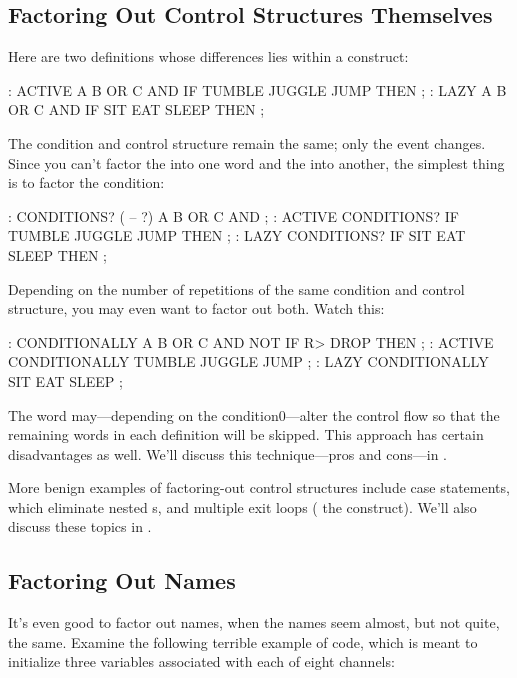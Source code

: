 \subsection{Factoring Out Control Structures Themselves}

Here are two definitions whose differences lies within a  construct:

\begin{Code}
: ACTIVE    A B OR  C AND  IF  TUMBLE JUGGLE JUMP THEN ;
: LAZY      A B OR  C AND  IF   SIT  EAT  SLEEP   THEN ;
\end{Code}
The condition and control structure remain the same; only the event
changes. Since you can't factor the  into one word and the
 into another, the simplest thing is to factor the
condition:

\begin{Code}
: CONDITIONS? ( -- ?) A B OR C AND ;
: ACTIVE    CONDITIONS? IF TUMBLE JUGGLE JUMP THEN ;
: LAZY      CONDITIONS? IF    SIT  EAT  SLEEP THEN ;
\end{Code}

\noindent 
Depending on the number of repetitions of the same condition and
control structure, you may even want to factor out both. Watch this:

\begin{Code}
: CONDITIONALLY   A B OR  C AND NOT IF  R> DROP   THEN ;
: ACTIVE   CONDITIONALLY   TUMBLE JUGGLE JUMP ;
: LAZY   CONDITIONALLY  SIT  EAT  SLEEP ;
\end{Code}
The word  may---depending on the condition0---alter
the control flow so that the remaining words in each definition will be
skipped. This approach has certain disadvantages as well. We'll
discuss this technique---pros and cons---in .

More benign examples of factoring-out control structures include case
statements, which eliminate nested s, and multiple exit loops ( the  construct). We'll also discuss these topics in
.

\subsection{Factoring Out Names}
It's even good to factor out names, when the names seem almost, but
not quite, the same. Examine the following terrible example of code,
which is meant to initialize three variables associated with each of
eight channels:

